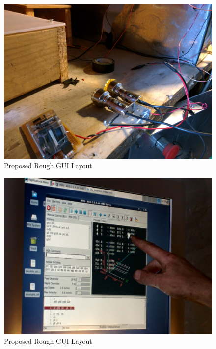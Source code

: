 \documentclass[12pt]{article}
\begin{document}
\begin{figure}[h]
\centering
\includegraphics[width=1\textwidth]{IMG_20150410_163554}
\caption{Proposed Rough GUI Layout}
\end{figure}

\clearpage


\begin{figure}[h]
\centering
\includegraphics[width=1\textwidth]{IMG_20150410_163626}
\caption{Proposed Rough GUI Layout}
\end{figure}

\clearpage
\end{document}
